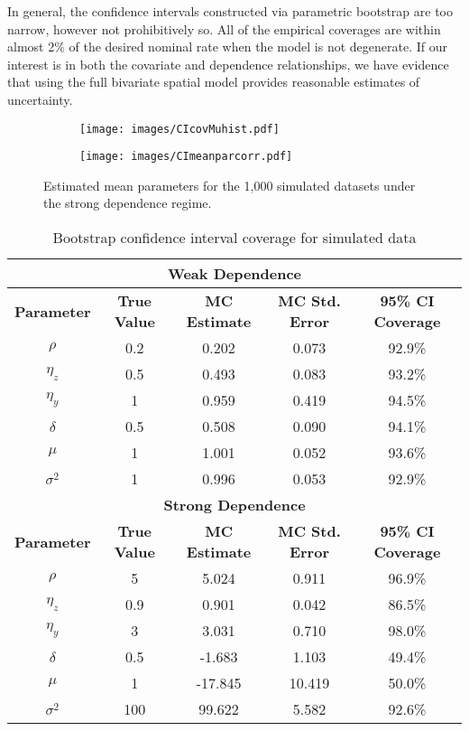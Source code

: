 \documentclass[12pt, a4paper, twoside]{article}
\begin{document}
In general, the confidence intervals constructed via parametric bootstrap are too narrow, however not prohibitively so. All of the empirical coverages are within almost 2\% of the desired nominal rate when the model is not degenerate. If our interest is in both the covariate and dependence relationships, we have evidence that using the full bivariate spatial model provides reasonable estimates of uncertainty.
\begin{figure}[H]
	\centering
	\begin{subfigure}{0.45\textwidth}
		\texttt{[image: images/CIcovMuhist.pdf]}%
	\end{subfigure}
	\begin{subfigure}{0.45\textwidth}
		\texttt{[image: images/CImeanparcorr.pdf]}%
	\end{subfigure}
	\caption[Mean parameter estimates under the strong dependence regime used for Monte Carlo study]{Estimated mean parameters for the 1,000 simulated datasets under the strong dependence regime.}
	\label{conditionalCIcov}
\end{figure}
\begin{table}[H]
	\centering
	\begin{tabular}{|c|c|c|c|c|}
		\hline
		\multicolumn{5}{|c|}{\textbf{Weak Dependence}} \\ \hline
		\textbf{Parameter}& \textbf{True Value} & \textbf{MC Estimate} & \textbf{MC Std. Error} & \textbf{95\% CI Coverage} \\ \hline
		$\rho$ & 0.2& 0.202& 0.073 & 92.9\% \\ \hline
		$\eta_{z}$&0.5& 0.493& 0.083 & 93.2\% \\ \hline
		$\eta_{y}$ & 1& 0.959& 0.419 & 94.5\% \\ \hline
		$\delta$ & 0.5&0.508& 0.090 & 94.1\% \\ \hline
		$\mu$ & 1&1.001& 0.052 & 93.6\% \\ \hline
		$\sigma^2$ &1 & 0.996& 0.053 & 92.9\% \\ \hline
		\hline
		\multicolumn{5}{|c|}{\textbf{Strong Dependence}} \\ \hline
		\textbf{Parameter}& \textbf{True Value} & \textbf{MC Estimate} & \textbf{MC Std. Error} & \textbf{95\% CI Coverage} \\ 
		\hline
		$\rho$ & 5 & 5.024& 0.911&96.9\% \\ \hline
		$\eta_{z}$ & 0.9 & 0.901& 0.042 & 86.5\% \\ \hline
		$\eta_{y}$ & 3 &3.031& 0.710& 98.0\% \\ \hline
		$\delta$ & 0.5 &-1.683& 1.103& 49.4\% \\ \hline
		$\mu$ & 1 &-17.845& 10.419& 50.0\% \\ \hline
		$\sigma^2$ &100& 99.622 & 5.582& 92.6\% \\ \hline
	\end{tabular}
\caption[Bootstrap confidence interval coverage for simulated data]{Bootstrap confidence interval coverage for simulated data}
\label{CIcoverage}
\end{table}
\end{document}

